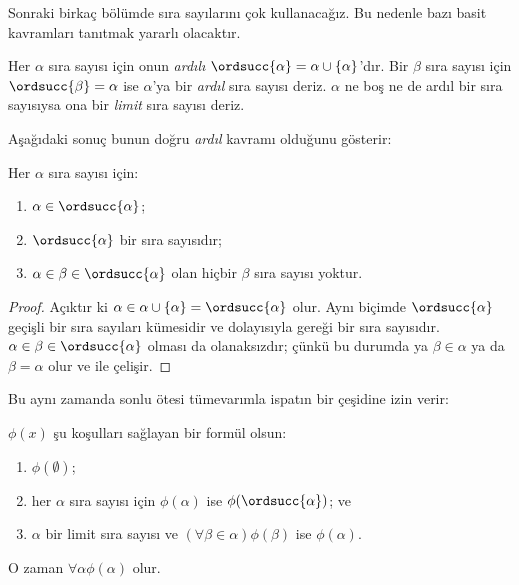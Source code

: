 \documentclass[../../../include/open-logic-section]{subfiles}
\begin{document}

Sonraki birkaç bölümde sıra sayılarını çok kullanacağız. Bu nedenle bazı
basit kavramları tanıtmak yararlı olacaktır.

\begin{defn}
Her $\alpha$ sıra sayısı için onun \emph{ardılı}
$\ordsucc{\alpha}=\alpha\cup\{\alpha\}$'dır. Bir $\beta$ sıra sayısı için
$\ordsucc{\beta}=\alpha$ ise $\alpha$'ya bir \emph{ardıl} sıra sayısı
deriz. $\alpha$ ne boş ne de ardıl bir sıra sayısıysa ona bir \emph{limit}
sıra sayısı deriz.
\end{defn}
\noindent
Aşağıdaki sonuç bunun doğru \emph{ardıl} kavramı olduğunu gösterir:

\begin{prop}
Her $\alpha$ sıra sayısı için:
\begin{enumerate}
	\item $\alpha \in \ordsucc{\alpha}$;
	\item $\ordsucc{\alpha}$ bir sıra sayısıdır;
	\item $\alpha \in \beta \in \ordsucc{\alpha}$ olan hiçbir $\beta$
	sıra sayısı yoktur.
	\end{enumerate}
\end{prop}

\begin{proof}
Açıktır ki $\alpha\in\alpha\cup\{\alpha\}=\ordsucc{\alpha}$ olur.
Aynı biçimde $\ordsucc{\alpha}$ geçişli bir sıra sayıları kümesidir ve
dolayısıyla  gereği bir sıra sayısıdır.
$\alpha\in\beta\in\ordsucc{\alpha}$ olması da olanaksızdır; çünkü bu
durumda ya $\beta\in\alpha$ ya da $\beta=\alpha$ olur ve
 ile çelişir.
\end{proof}
\noindent
Bu aynı zamanda sonlu ötesi tümevarımla ispatın bir çeşidine izin verir:

\begin{thm}
$\phi(x)$ şu koşulları sağlayan bir formül olsun:
\begin{enumerate}
	\item $\phi(\emptyset)$;
	\item her $\alpha$ sıra sayısı için $\phi(\alpha)$ ise
	$\phi(\ordsucc{\alpha})$; ve
	\item $\alpha$ bir limit sıra sayısı ve
	$(\forall\beta\in\alpha)\phi(\beta)$ ise $\phi(\alpha)$.
\end{enumerate}
O zaman $\forall\alpha\phi(\alpha)$ olur.
\end{thm}
\end{document}

